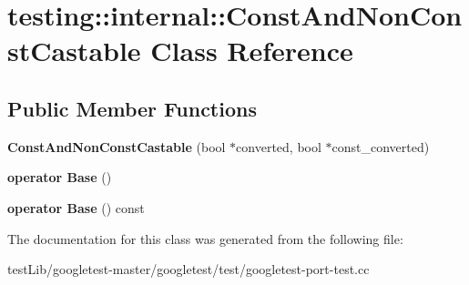 \hypertarget{classtesting_1_1internal_1_1ConstAndNonConstCastable}{}\section{testing\+:\+:internal\+:\+:Const\+And\+Non\+Const\+Castable Class Reference}
\label{classtesting_1_1internal_1_1ConstAndNonConstCastable}
\subsection*{Public Member Functions}
\begin{DoxyCompactItemize}
\item 
\mbox{\label{classtesting_1_1internal_1_1ConstAndNonConstCastable_aebe0ef6897b7f805e227bb969d4ee034}} 
{\bfseries Const\+And\+Non\+Const\+Castable} (bool $\ast$converted, bool $\ast$const\+\_\+converted)
\item 
\mbox{\label{classtesting_1_1internal_1_1ConstAndNonConstCastable_aff0c372d429d76d002bb29f83f2429fa}} 
{\bfseries operator Base} ()
\item 
\mbox{\label{classtesting_1_1internal_1_1ConstAndNonConstCastable_a4e8ee8051162f1dfc1da294c71481e2f}} 
{\bfseries operator Base} () const
\end{DoxyCompactItemize}


The documentation for this class was generated from the following file\+:\begin{DoxyCompactItemize}
\item 
test\+Lib/googletest-\/master/googletest/test/googletest-\/port-\/test.\+cc\end{DoxyCompactItemize}

